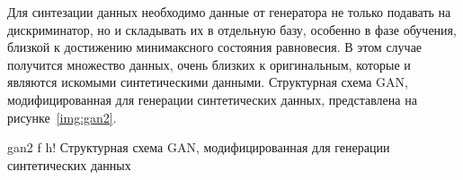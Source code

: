 Для синтезации данных необходимо данные от генератора не только подавать на дискриминатор, но и складывать их в отдельную базу, особенно в фазе обучения, близкой к достижению минимаксного состояния равновесия.
В этом случае получится множество данных, очень близких к оригинальным, которые и являются искомыми синтетическими данными.
\newpage
Структурная схема GAN, модифицированная для генерации синтетических данных, представлена на рисунке~\ref{img:gan2}.


{gan2} %
{f} %
{h!} %
{\textwidth} %
{Структурная схема GAN, модифицированная для генерации синтетических данных} %

